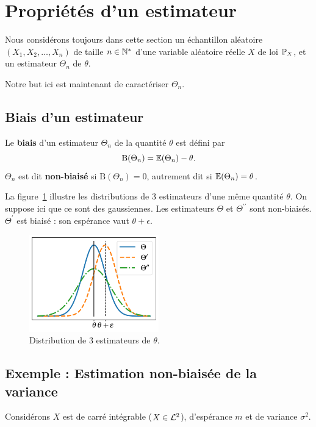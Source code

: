 \section{Propriétés d'un estimateur}
Nous considérons toujours dans cette section un échantillon aléatoire
$(X_1, X_2, \dots, X_n)$ de taille $n \in \mathbb{N}^*$ d'une variable aléatoire
réelle $X$ de loi $\mathbb{P}_X$, et un estimateur $\Theta_n$ de $\theta$.

Notre but ici est maintenant de caractériser $\Theta_n$.

\subsection{Biais d'un estimateur}
\label{sec:biais_estimateur}
Le \textbf{biais} d'un estimateur $\Theta_n$ de la quantité $\theta$ est défini par 
\begin{equation}
  \text{B}(\Theta_n) = \mathbb{E}(\Theta_n) - \theta.
  \label{eq:biais}
\end{equation}
$\Theta_n$ est dit \textbf{non-biaisé} si $\text{B}(\Theta_n) = 0$, autrement dit si
$\mathbb{E}(\Theta_n) = \theta$.

La figure~\ref{fig:biais_variance} illustre les distributions de 3 estimateurs
d'une même quantité $\theta$. On suppose ici que ce sont des gaussiennes. Les
estimateurs $\Theta$ et $\Theta^{\prime\prime}$ sont
non-biaisés. $\Theta^\prime$ est biaisé : son espérance vaut
$\theta + \epsilon$.

\begin{figure}[h]
  \centering
  \includegraphics[width=0.5\textwidth]{figures/estimation/biais_variance}
  \caption{Distribution de 3 estimateurs de $\theta$.}
  \label{fig:biais_variance}
\end{figure}

\subsection{Exemple : Estimation non-biaisée de la variance}
\label{sec:unbiased_variance_estimation}
Considérons $X$ est de carré intégrable ($X \in \mathcal{L}^2$), d'espérance $m$ et
de variance $\sigma^2$.

